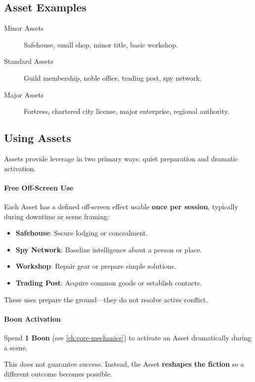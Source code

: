 \subsection*{Asset Examples}
\label{sec:asset-examples}
\begin{description}
\item[Minor Assets] Safehouse, small shop, minor title, basic workshop.
\item[Standard Assets] Guild membership, noble office, trading post, spy network.
\item[Major Assets] Fortress, chartered city license, major enterprise, regional authority.
\end{description}

\subsection*{Using Assets}
\label{sec:using-assets}

Assets provide leverage in two primary ways: quiet preparation and dramatic activation.

\paragraph{Free Off-Screen Use}
\label{sec:asset-free-use}
Each Asset has a defined off-screen effect usable \textbf{once per session}, typically during downtime or scene framing:
\begin{itemize}
\item \textbf{Safehouse}: Secure lodging or concealment.
\item \textbf{Spy Network}: Baseline intelligence about a person or place.
\item \textbf{Workshop}: Repair gear or prepare simple solutions.
\item \textbf{Trading Post}: Acquire common goods or establish contacts.
\end{itemize}
These uses prepare the ground---they do not resolve active conflict.

\paragraph{Boon Activation}
\label{sec:asset-boon-activation}
Spend \textbf{1 Boon} (see \ref{ch:core-mechanics}) to activate an Asset dramatically during a scene.

This does not guarantee success. Instead, the Asset \textbf{reshapes the fiction} so a different outcome becomes possible.

